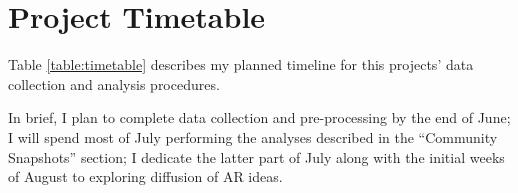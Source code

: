 \documentclass[acmlarge, screen, authorversion]{acmart}
\begin{document}
\section{Project Timetable}

Table \ref{table:timetable} describes my planned timeline for this projects' data collection and analysis procedures.

In brief, I plan to complete data collection and pre-processing by the end of June; I will spend most of July performing the analyses described in the ``Community Snapshots'' section; I dedicate the latter part of July along with the initial weeks of August to exploring diffusion of AR ideas.

\clearpage


\end{document}
